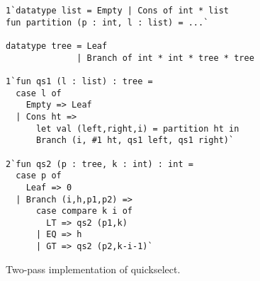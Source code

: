 \begin{figure}
\begin{lstlisting}
1`datatype list = Empty | Cons of int * list
fun partition (p : int, l : list) = ...`

datatype tree = Leaf
              | Branch of int * int * tree * tree

1`fun qs1 (l : list) : tree =
  case l of
    Empty => Leaf
  | Cons ht => 
      let val (left,right,i) = partition ht in
      Branch (i, #1 ht, qs1 left, qs1 right)`

2`fun qs2 (p : tree, k : int) : int = 
  case p of
    Leaf => 0
  | Branch (i,h,p1,p2) => 
      case compare k i of
        LT => qs2 (p1,k)
      | EQ => h
      | GT => qs2 (p2,k-i-1)`
\end{lstlisting}
\caption{Two-pass implementation of quickselect.}
\label{fig:qs-split}
\end{figure}

